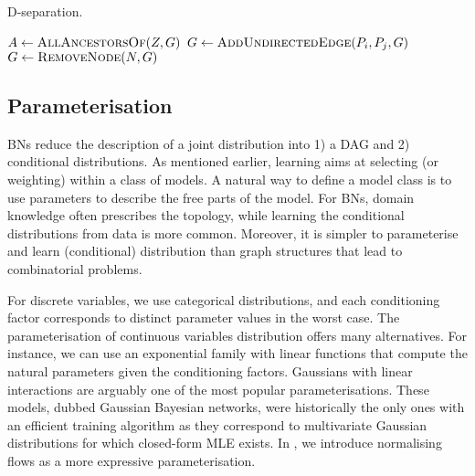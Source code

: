 \begin{algorithm}
\caption{D-separation.}\label{alg:d-separation}
  \begin{algorithmic}
      \State {}
      \State {}
      \State $A \gets \Call{AllAncestorsOf}{Z, G}$
       
          \State $G \gets \Call{AddUndirectedEdge}{P_i, P_j, G}$ 
        \EndIf
      \EndFor
        \State $G \gets \Call{RemoveNode}{N, G}$
      \EndFor
      \State {}
    \EndFunction
   \end{algorithmic}
\end{algorithm}

\subsection{Parameterisation}
BNs reduce the description of a joint distribution into 1) a DAG and 2) conditional distributions. As mentioned earlier, learning aims at selecting (or weighting) within a class of models. A natural way to define a model class is to use parameters to describe the free parts of the model. For BNs, domain knowledge often prescribes the topology, while learning the conditional distributions from data is more common. Moreover, it is simpler to parameterise and learn (conditional) distribution than graph structures that lead to combinatorial problems.

For discrete variables, we use categorical distributions, and each conditioning factor corresponds to distinct parameter values in the worst case. The parameterisation of continuous variables distribution offers many alternatives. For instance, we can use an exponential family with linear functions that compute the natural parameters given the conditioning factors. Gaussians with linear interactions are arguably one of the most popular parameterisations. These models, dubbed Gaussian Bayesian networks, were historically the only ones with an efficient training algorithm as they correspond to multivariate Gaussian distributions \citep{wermuth1980linear} for which closed-form MLE exists. In , we introduce normalising flows as a more expressive parameterisation.
